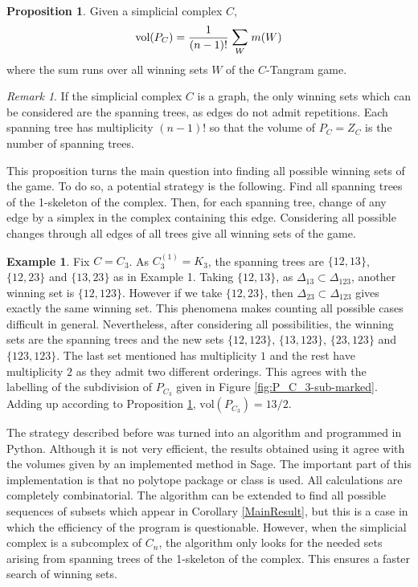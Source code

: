 \documentclass[english,11pt]{article}
\theoremstyle{definition}
\theoremstyle{definition}
\newtheorem{proposition}{Proposition}[section]
\theoremstyle{definition}
\newtheorem{example}{Example}[section]
\theoremstyle{remark}
\newtheorem*{remark}{Remark}
\theoremstyle{definition}
\begin{document}
\begin{proposition}\label{vol-game}
Given a simplicial complex $C$, $$\text{vol}(P_C) = \frac{1}{(n-1)!} \; \mathlarger{\sum}_{{W}} \; m({W})$$ where the sum runs over all winning sets ${W}$ of the $C$-Tangram game.
\end{proposition}

\begin{remark}
If the simplicial complex $C$ is a graph, the only winning sets which can be considered are the spanning trees, as edges do not admit repetitions. Each spanning tree has multiplicity $(n-1)!$ so that the volume of $P_C=Z_C$ is the number of spanning trees.
\end{remark}

This proposition turns the main question into finding all possible winning sets of the game. To do so, a potential strategy is the following. Find all spanning trees of the 1-skeleton of the complex. Then, for each spanning tree, change of any edge by a simplex in the complex containing this edge. Considering all possible changes through all edges of all trees give all winning sets of the game. 

\begin{example}
Fix $C=C_3$. As $C_3^{(1)} = K_3$, the spanning trees are $\{12,13\}$, $\{12,23\}$ and $\{13,23\}$ as in Example 1. Taking $\{12,13\}$, as $\Delta_{13}\subset \Delta_{123}$, another winning set is $\{12,123\}$. However if we take $\{12,23\}$, then $\Delta_{23}\subset \Delta_{123}$ gives exactly the same winning set. This phenomena makes counting all possible cases difficult in general. Nevertheless, after considering all possibilities, the winning sets are the spanning trees and the new sets $\{12,123\}$, $\{13,123\}$, $\{23,123\}$ and $\{123,123\}$. The last set mentioned has multiplicity $1$ and the rest have multiplicity $2$ as they admit two different orderings. This agrees with the labelling of the subdivision of $P_{C_3}$ given in Figure \ref{fig:P_C_3-sub-marked}. Adding up according to Proposition \ref{vol-game}, $\text{vol}(P_{C_3}) = 13/2$.
\end{example}

The strategy described before was turned into an algorithm and programmed in Python. Although it is not very efficient, the results obtained using it agree with the volumes given by an implemented method in Sage. The important part of this implementation is that no polytope package or class is used. All calculations are completely combinatorial. The algorithm can be extended to find all possible sequences of subsets which appear in Corollary \ref{MainResult}, but this is a case in which the efficiency of the program is questionable. However, when the simplicial complex is a subcomplex of $C_n$, the algorithm only looks for the needed sets arising from spanning trees of the 1-skeleton of the complex. This ensures a faster search of winning sets. 
\end{document}
